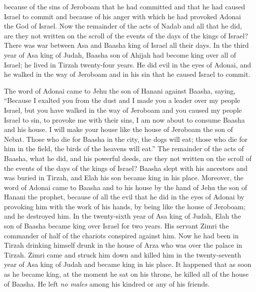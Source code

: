 \begin{biblechapter}
\verse because of the sins of Jeroboam that he had committed and that he had caused Israel to commit and because of his anger with which he had provoked Adonai the God of Israel.
\verse Now the remainder of the acts of Nadab and all that he did, are they not written on the scroll of the events of the days of the kings of Israel?
 There was war between Asa and Baasha king of Israel all their days.
\verse In the third year of Asa king of Judah, Baasha son of Ahijah had become king over all of Israel; he lived in Tirzah twenty-four years.
\verse He did evil in the eyes of Adonai, and he walked in the way of Jeroboam and in his sin that he caused Israel to commit.
\end{biblechapter}

\begin{biblechapter} %
\verse The word of Adonai came to Jehu the son of Hanani against Baasha, saying,
\verse “Because I exalted you from the dust and I made you a leader over my people Israel, but you have walked in the way of Jeroboam and you caused my people Israel to sin, to provoke me with their sins,
\verse I am now about to consume Baasha and his house. I will make your house like the house of Jeroboam the son of Nebat.
\verse Those who die for Baasha in the city, the dogs will eat; those who die for him in the field, the birds of the heavens will eat.”
\verse The remainder of the acts of Baasha, what he did, and his powerful deeds, are they not written on the scroll of the events of the days of the kings of Israel?
\verse Baasha slept with his ancestors and was buried in Tirzah, and Elah his son became king in his place.
\verse Moreover, the word of Adonai came to Baasha and to his house by the hand of Jehu the son of Hanani the prophet, because of all the evil that he did in the eyes of Adonai by provoking him with the work of his hands, by being like the house of Jeroboam; and he destroyed him.
 In the twenty-sixth year of Asa king of Judah, Elah the son of Baasha became king over Israel for two years.
\verse His servant Zimri the commander of half of the chariots conspired against him. Now he had been in Tirzah drinking himself drunk in the house of Arza who was over the palace in Tirzah.
\verse Zimri came and struck him down and killed him in the twenty-seventh year of Asa king of Judah and became king in his place.
\verse It happened that as soon as he became king, at the moment he sat on his throne, he killed all of the house of Baasha. He left \textit{no males} among his kindred or any of his friends.

\end{biblechapter}
